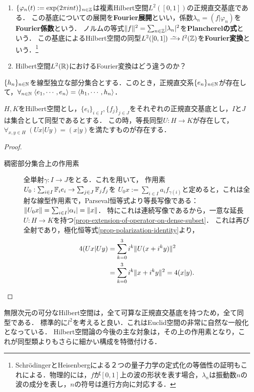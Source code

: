 \documentclass[uplatex,dvipdfmx]{jsreport}
\begin{document}
\begin{example}\mbox{}
    \begin{enumerate}
        \item $\{\varphi_n(t):=\exp(2\pi int)\}_{n\in\mathbb{Z}}$は複素Hilbert空間$L^2([0,1])$の正規直交基底である．
        この基底についての展開を\textbf{Fourier展開}といい，係数$\lambda_n=(f|\varphi_n)$を\textbf{Fourier係数}という．
        ノルムの等式$\|f\|^2=\sum_{n\in\mathbb{Z}}\lvert\lambda_n\rvert^2$を\textbf{Plancherelの式}という．
        この基底によるHilbert空間の同型$L^2([0,1])\iso l^2(\Z)$を\textbf{Fourier変換}という．\footnote{SchrödingerとHeisenbergによる２つの量子力学の定式化の等価性の証明もこれによる．物理的には，$f$が$[0,1]$上の波の形状を表す場合，$\lambda_n$は振動数$n$の波の成分を表し，$n$の符号は進行方向に対応する．}
        \item Hilbert空間$L^2(\mathbb{R})$におけるFourier変換はどう違うのか？
    \end{enumerate}
\end{example}

\begin{theorem}
    $\{h_n\}_{n\in\mathbb{N}}$を線型独立な部分集合とする．このとき，正規直交系$\{e_n\}_{n\in\mathbb{N}}$が存在して，$\forall_{n\in\mathbb{N}}\;\langle e_1,\cdots,e_n\rangle=\langle h_1,\cdots,h_n\rangle$．
\end{theorem}

\begin{proposition}[Hilbert空間の同型類]\label{prop-characterization-of-isomorphism-of-Hilbert-spaces}
    $H,K$をHilbert空間とし，$\{e_i\}_{i\in I},\{f_j\}_{j\in J}$をそれぞれの正規直交基底とし，$I$と$J$は集合として同型であるとする．
    この時，等長同型$U:H\to K$が存在して，$\forall_{x,y\in H}\;(Ux|Uy)=(x|y)$を満たすものが存在する．
\end{proposition}
\begin{proof}\mbox{}
    \begin{description}
        \item[稠密部分集合上の作用素] 全単射$\gamma:I\to J$をとる．これを用いて，
        作用素$U_0:\sum_{i\in I}\mathbb{F}_ie_i\to\sum_{j\in J}\mathbb{F}_jf_j$を
        $U_0x:=\sum_{i\in I}a_if_{\gamma(i)}$と定めると，これは全射な線型作用素で，Parseval恒等式より等長写像である：$\|U_0x\|=\sum_{i\in I}\lvert\alpha_i\rvert=\|x\|$．
        特にこれは連続写像であるから，一意な延長$U:H\to K$を持つ\ref{prop-extension-of-operator-on-dense-subset}．
        これは再び全射であり，極化恒等式\ref{prop-polarization-identity}より，
        \begin{align*}
            4(Ux|Uy)&=\sum_{k=0}^3i^k\|U(x+i^ky)\|^2\\
            &=\sum_{k=0}^3i^k\|x+i^ky\|^2=4(x|y).
        \end{align*}
    \end{description}
\end{proof}
\begin{remarks}
    無限次元の可分なHilbert空間は，全て可算な正規直交基底を持つため，全て同型である．
    標準的に$l^2$を考えると良い．これはEuclid空間の非常に自然な一般化となっている．
    Hilbert空間論の今後の主な対象は，その上の作用素となり，これが同型類よりもさらに細かい構成を特徴付ける．
\end{remarks}
\end{document}

